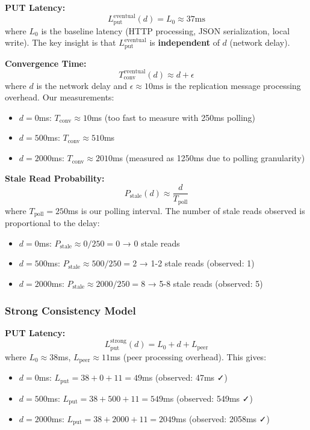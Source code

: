 \documentclass[10pt,a4paper]{article}
\begin{document}
\textbf{PUT Latency:}
\begin{equation}
L_{\text{put}}^{\text{eventual}}(d) = L_0 \approx 37\text{ms}
\end{equation}
where $L_0$ is the baseline latency (HTTP processing, JSON serialization, local write). The key insight is that $L_{\text{put}}^{\text{eventual}}$ is \textbf{independent} of $d$ (network delay).

\textbf{Convergence Time:}
\begin{equation}
T_{\text{conv}}^{\text{eventual}}(d) \approx d + \epsilon
\end{equation}
where $d$ is the network delay and $\epsilon \approx 10\text{ms}$ is the replication message processing overhead. Our measurements:
\begin{itemize}
    \item $d=0$ms: $T_{\text{conv}} \approx 10$ms (too fast to measure with 250ms polling)
    \item $d=500$ms: $T_{\text{conv}} \approx 510$ms
    \item $d=2000$ms: $T_{\text{conv}} \approx 2010$ms (measured as 1250ms due to polling granularity)
\end{itemize}

\textbf{Stale Read Probability:}
\begin{equation}
P_{\text{stale}}(d) \approx \frac{d}{T_{\text{poll}}}
\end{equation}
where $T_{\text{poll}} = 250$ms is our polling interval. The number of stale reads observed is proportional to the delay:
\begin{itemize}
    \item $d=0$ms: $P_{\text{stale}} \approx 0/250 = 0$ → 0 stale reads
    \item $d=500$ms: $P_{\text{stale}} \approx 500/250 = 2$ → 1-2 stale reads (observed: 1)
    \item $d=2000$ms: $P_{\text{stale}} \approx 2000/250 = 8$ → 5-8 stale reads (observed: 5)
\end{itemize}

\subsubsection{Strong Consistency Model}

\textbf{PUT Latency:}
\begin{equation}
L_{\text{put}}^{\text{strong}}(d) = L_0 + d + L_{\text{peer}}
\end{equation}
where $L_0 \approx 38$ms, $L_{\text{peer}} \approx 11$ms (peer processing overhead). This gives:
\begin{itemize}
    \item $d=0$ms: $L_{\text{put}} = 38 + 0 + 11 = 49$ms (observed: 47ms ✓)
    \item $d=500$ms: $L_{\text{put}} = 38 + 500 + 11 = 549$ms (observed: 549ms ✓)
    \item $d=2000$ms: $L_{\text{put}} = 38 + 2000 + 11 = 2049$ms (observed: 2058ms ✓)
\end{itemize}
\end{document}
